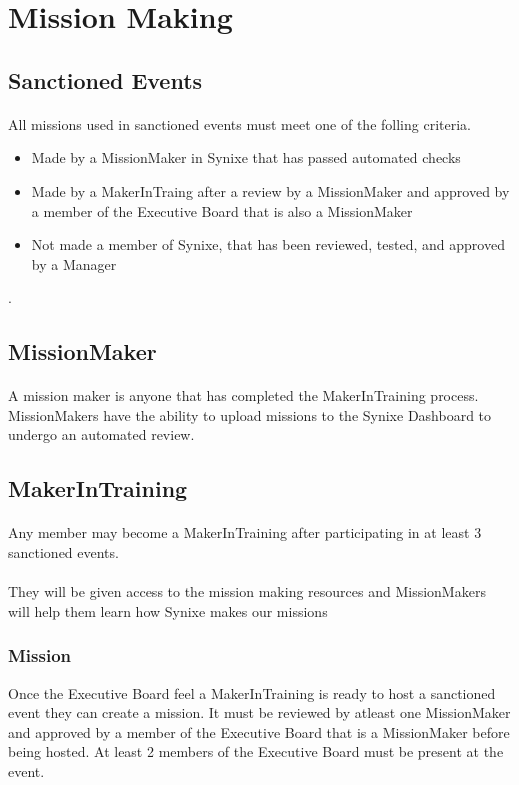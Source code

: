 \documentclass[10pt,a4paper]{article}
\begin{document}
\section{Mission Making}
\subsection{Sanctioned Events}
\paragraph{}
All missions used in sanctioned events must meet one of the folling criteria.
\begin{itemize}
  \item Made by a MissionMaker in Synixe that has passed automated checks
  \item Made by a MakerInTraing after a review by a MissionMaker and approved by a member of the Executive Board that is also a MissionMaker
  \item Not made a member of Synixe, that has been reviewed, tested, and approved by a Manager
\end{itemize}.
\subsection{MissionMaker}
\paragraph{}
A mission maker is anyone that has completed the MakerInTraining process. MissionMakers have the ability to upload missions to the Synixe Dashboard to undergo an automated review.
\subsection{MakerInTraining}
\paragraph{}
Any member may become a MakerInTraining after participating in at least 3 sanctioned events.
\paragraph{}
They will be given access to the mission making resources and MissionMakers will help them learn how Synixe makes our missions
\subsubsection{Mission}
Once the Executive Board feel a MakerInTraining is ready to host a sanctioned event they can create a mission. It must be reviewed by atleast one MissionMaker and approved by a member of the Executive Board that is a MissionMaker before being hosted. At least 2 members of the Executive Board must be present at the event.
\end{document}
